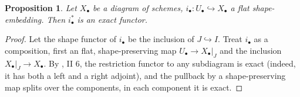 \documentclass[proquest]{uwthesis}[2014/11/13]
\newtheorem{prop}[theorem]{Proposition}
\theoremstyle{definition}
\begin{document}
\begin{prop}
	Let $X_\bullet$ be a diagram of schemes, $i_\bullet : U_\bullet \hookrightarrow X_\bullet$ a flat shape-embedding.
	Then $i_\bullet^*$ is an exact functor.
\end{prop}
\begin{proof}
	Let the shape functor of $i_\bullet$ be the inclusion of $J \hookrightarrow I$.
	Treat $i_\bullet$ as a composition, first an flat, shape-preserving map $U_\bullet \rightarrow X_\bullet|_J$ and the inclusion $X_\bullet|_J \rightarrow X_\bullet$.
	By \cite{Lipman2009}, II 6, the restriction functor to any subdiagram is exact (indeed, it has both a left and a right adjoint), and the pullback by a shape-preserving map splits over the components, in each component it is exact.
\end{proof}
\end{document}
